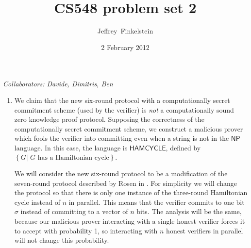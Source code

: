 \documentclass{article}
\author{Jef{}frey~Finkelstein}
\date{2 February 2012}
\title{CS548 problem set 2}
\newcommand{\collaborators}[1]{\emph{Collaborators: #1}}
\newcommand{\class}[1]{{\ensuremath{\mathsf{#1}}}}
\newcommand{\lang}[1]{{\ensuremath{\mathsf{#1}}}}
\newcommand{\NP}{\class{NP}}
\begin{document}
\maketitle
\collaborators{Davide, Dimitris, Ben}
\begin{enumerate}

\item
  We claim that the new six-round protocol with a computationally secret commitment scheme (used by the verifier) is \emph{not} a computationally sound zero knowledge proof protocol.
  Supposing the correctness of the computationally secret commitment scheme, we construct a malicious prover which fools the verifier into committing even when a string is not in the $\NP$ language.
  In this case, the language is \lang{HAMCYCLE}, defined by $\left\{G \,|\, G\text{ has a Hamiltonian cycle}\right\}$.

  We will consider the new six-round protocol to be a modification of the seven-round protocol described by Rosen in \cite[Figure 2]{rosen}.
  For simplicity we will change the protocol so that there is only one instance of the three-round Hamiltonian cycle instead of $n$ in parallel.
  This means that the verifier commits to one bit $\sigma$ instead of committing to a vector of $n$ bits.
  The analysis will be the same, because our malicious prover interacting with a single honest verifier forces it to accept with probability 1, so interacting with $n$ honest verifiers in parallel will not change this probability.


\end{enumerate}
\end{document}
